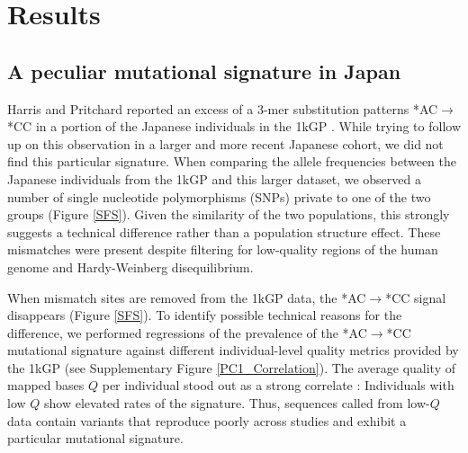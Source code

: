 \documentclass[custompaper]{MBE}%
\begin{document}
\section{Results}

			
\subsection{A peculiar mutational signature in Japan}			
	
Harris and Pritchard reported an excess of a 3-mer substitution patterns *AC${\rightarrow}$*CC in a portion of the Japanese individuals in the 1kGP \citep{Harris2017a}.
While trying to follow up on this observation in a larger and more recent Japanese cohort, we did not find this particular signature.
When comparing the allele frequencies between the Japanese individuals from the 1kGP and this larger dataset, we observed a number of single nucleotide polymorphisms (SNPs) private to one of the two groups (Figure \ref{SFS}).
Given the similarity of the two populations, this strongly suggests a technical difference rather than a population structure effect.
These mismatches were present despite filtering for low-quality regions of the human genome and Hardy-Weinberg disequilibrium. 

When mismatch sites are removed from the 1kGP data, the  *AC${\rightarrow}$*CC signal disappears (Figure \ref{SFS}). To identify possible technical reasons for the difference, we performed regressions of the prevalence of the  *AC${\rightarrow}$*CC mutational signature against different individual-level quality metrics provided by the 1kGP (see Supplementary Figure \ref{PC1_Correlation}). 
The average quality of mapped bases  $Q$ per individual stood out as a strong correlate : Individuals with low $Q$ show elevated rates of the signature. 
Thus, sequences called from low-$Q$ data contain variants that reproduce poorly across studies and exhibit a particular mutational signature. 
\end{document}

